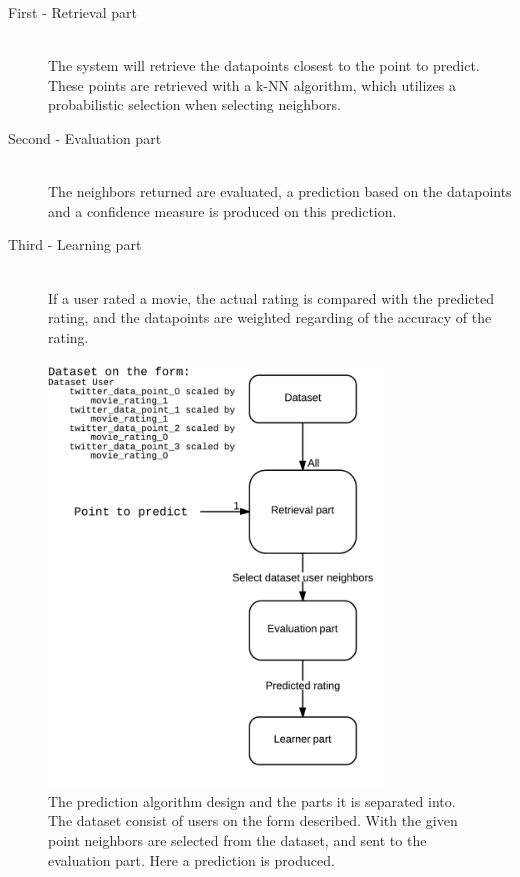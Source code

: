 \begin{description}
    \item[First - Retrieval part] \hfill \\
    The system will retrieve the datapoints closest to the point to predict. These points are retrieved with a k-NN algorithm, which utilizes a probabilistic selection when selecting neighbors.

    \item[Second - Evaluation part] \hfill \\
    The neighbors returned are evaluated, a prediction based on the datapoints and a confidence measure is produced on this prediction.

    \item[Third - Learning part] \hfill \\
    If a user rated a movie, the actual rating is compared with the predicted rating, and the datapoints are weighted regarding of the accuracy of the rating.
\end{description}

\begin{figure}[H]
\centerline{\includegraphics[width=3.5in]{image/pred-alg.png}}
\caption[Prediction algorithm parts]{The prediction algorithm design and the parts it is separated into. The dataset consist of users on the form described. With the given point neighbors are selected from the dataset, and sent to the evaluation part. Here a prediction is produced.}
\label{figure:pred-alg}
\end{figure}
